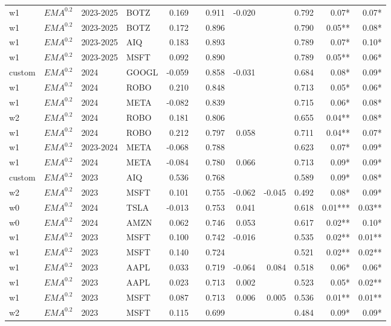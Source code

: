 {\begin{tabularx}{\textwidth}{@{}X@{\hspace{0.5pt}}X@{\hspace{0.5pt}}X@{\hspace{0.5pt}}X@{\hspace{2.0pt}} r r r r r r r r@{}}
w1 & $EMA^{0.2}$ & 2023-2025 & BOTZ & 0.169 &  & 0.911 & -0.020 &  & 0.792 & 0.07* & 0.07* \\
w1 & $EMA^{0.2}$ & 2023-2025 & BOTZ & 0.172 &  & 0.896 &  &  & 0.790 & 0.05** & 0.08* \\
w1 & $EMA^{0.2}$ & 2023-2025 & AIQ & 0.183 &  & 0.893 &  &  & 0.789 & 0.07* & 0.10* \\
w1 & $EMA^{0.2}$ & 2023-2025 & MSFT & 0.092 &  & 0.890 &  &  & 0.789 & 0.05** & 0.06* \\
custom & $EMA^{0.2}$ & 2024 & GOOGL & -0.059 &  & 0.858 & -0.031 &  & 0.684 & 0.08* & 0.09* \\
w1 & $EMA^{0.2}$ & 2024 & ROBO & 0.210 &  & 0.848 &  &  & 0.713 & 0.05* & 0.06* \\
w1 & $EMA^{0.2}$ & 2024 & META & -0.082 &  & 0.839 &  &  & 0.715 & 0.06* & 0.08* \\
w2 & $EMA^{0.2}$ & 2024 & ROBO & 0.181 &  & 0.806 &  &  & 0.655 & 0.04** & 0.08* \\
w1 & $EMA^{0.2}$ & 2024 & ROBO & 0.212 &  & 0.797 & 0.058 &  & 0.711 & 0.04** & 0.07* \\
w1 & $EMA^{0.2}$ & 2023-2024 & META & -0.068 &  & 0.788 &  &  & 0.623 & 0.07* & 0.09* \\
w1 & $EMA^{0.2}$ & 2024 & META & -0.084 &  & 0.780 & 0.066 &  & 0.713 & 0.09* & 0.09* \\
custom & $EMA^{0.2}$ & 2023 & AIQ & 0.536 &  & 0.768 &  &  & 0.589 & 0.09* & 0.08* \\
w2 & $EMA^{0.2}$ & 2023 & MSFT & 0.101 &  & 0.755 & -0.062 & -0.045 & 0.492 & 0.08* & 0.09* \\
w0 & $EMA^{0.2}$ & 2024 & TSLA & -0.013 &  & 0.753 & 0.041 &  & 0.618 & 0.01*** & 0.03** \\
w0 & $EMA^{0.2}$ & 2024 & AMZN & 0.062 &  & 0.746 & 0.053 &  & 0.617 & 0.02** & 0.10* \\
w1 & $EMA^{0.2}$ & 2023 & MSFT & 0.100 &  & 0.742 & -0.016 &  & 0.535 & 0.02** & 0.01** \\
w1 & $EMA^{0.2}$ & 2023 & MSFT & 0.140 &  & 0.724 &  &  & 0.521 & 0.02** & 0.02** \\
w1 & $EMA^{0.2}$ & 2023 & AAPL & 0.033 &  & 0.719 & -0.064 & 0.084 & 0.518 & 0.06* & 0.06* \\
w1 & $EMA^{0.2}$ & 2023 & AAPL & 0.023 &  & 0.713 & 0.002 &  & 0.523 & 0.05* & 0.02** \\
w1 & $EMA^{0.2}$ & 2023 & MSFT & 0.087 &  & 0.713 & 0.006 & 0.005 & 0.536 & 0.01** & 0.01** \\
w2 & $EMA^{0.2}$ & 2023 & MSFT & 0.115 &  & 0.699 &  &  & 0.484 & 0.09* & 0.09* \\

\end{tabularx}}
